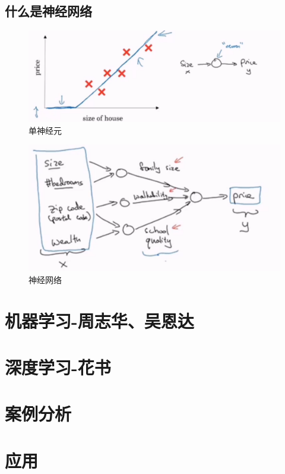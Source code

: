 \documentclass[UTF8,a4paper,12pt]{ctexbook}
\begin{document}
	\section{什么是神经网络}
		\begin{figure}[H]
			\centering
			\includegraphics[width=\linewidth]{Neuron}
			\caption{单神经元}
		\end{figure}
	
	
		\begin{figure}[H]
			\centering
			\includegraphics[width=\linewidth]{Neuron2}
			\caption{神经网络}
		\end{figure}
	
	

\chapter{机器学习-周志华、吴恩达}


\chapter{深度学习-花书}



\chapter{案例分析}


\chapter{应用}



  
		    
\end{document}
